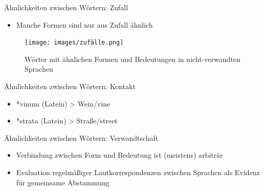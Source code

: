\begin{frame}{Ähnlichkeiten zwischen Wörtern: Zufall}
	\begin{itemize}
		\item Manche Formen sind nur aus Zufall ähnlich
	\end{itemize}
	\begin{figure}
		\texttt{[image: images/zufälle.png]}
		\caption{Wörter mit ähnlichen Formen und Bedeutungen in nicht-verwandten Sprachen \parencite{McMahon1994}}
	\end{figure}
\end{frame}
	

\begin{frame}{Ähnlichkeiten zwischen Wörtern: Kontakt}
	\begin{itemize}
		\item *vinum (Latein) > Wein/vine
		\item *strata (Latein) > Straße/street
	\end{itemize}
\end{frame}

\begin{frame}{Ähnlichkeiten zwischen Wörtern: Verwandtschaft}
	\begin{itemize}
		\item Verbindung zwischen Form und Bedeutung ist (meistens) arbiträr  \pause
		\item Evaluation regelmäßiger Lautkorrespondenzen zwischen Sprachen als Evidenz für gemeinsame Abstammung
	\end{itemize}
\end{frame}


